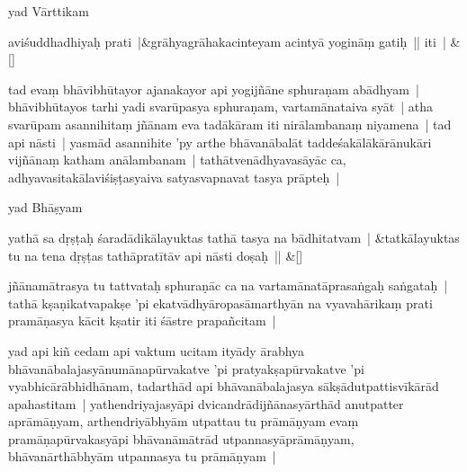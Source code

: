 \documentclass[article,12pt,a4paper]{memoir}%
\newcommand{\name}[1]{#1}
\newcounter{parCount}
\begin{document}
	  \pstart \leavevmode%
	\label{thakur75-22.1}yad Vārttikam 
	{}
	\pend%
      
	    
	    \stanza[\smallbreak]
	  aviśuddhadhiyaḥ prati |&grāhyagrāhakacinteyam acintyā yogināṃ gatiḥ || iti | \&[\smallbreak]
	  
	  
	  

	  \pstart \leavevmode%
	\label{thakur75-22.4}tad evaṃ bhāvibhūtayor ajanakayor api yogijñāne sphuraṇam abādhyam | bhāvibhūtayos tarhi yadi svarūpasya sphuraṇam, vartamānataiva syāt | atha svarūpam asannihitaṃ jñānam eva tadākāram iti nirālambanaṃ niyamena | tad api nāsti | yasmād asannihite 'py arthe bhāvanābalāt taddeśakālākārānukāri vijñānaṃ katham anālambanam | tathātvenādhyavasāyāc ca, adhyavasitakālaviśiṣṭasyaiva satyasvapnavat tasya prāpteḥ | 
	{}
	\pend%
      

	  \pstart \leavevmode%
	yad \name{Bhāṣyam}
	{}
	\pend%
      
	    
	    \stanza[\smallbreak]
	  yathā sa dṛṣṭaḥ śaradādikālayuktas tathā tasya na bādhitatvam | &tatkālayuktas tu na tena dṛṣṭas tathāpratītāv api nāsti doṣaḥ || \&[\smallbreak]
	  
	  
	  

	  \pstart \leavevmode%
	jñānamātrasya tu tattvataḥ sphuraṇāc ca na vartamānatāprasaṅgaḥ saṅgataḥ | tathā kṣaṇikatvapakṣe 'pi ekatvādhyāropasāmarthyān na vyavahārikaṃ prati pramāṇasya kācit kṣatir iti śāstre prapañcitam | 
	{}
	\pend%
      

	  \pstart \leavevmode%
	\label{thakur75-22.17}yad api kiñ cedam api vaktum ucitam ityādy ārabhya bhāvanābalajasyānumānapūrvakatve 'pi pratyakṣapūrvakatve 'pi vyabhicārābhidhānam, tadarthād api bhāvanābalajasya sākṣādutpattisvīkārād apahastitam | yathendriyajasyāpi dvicandrādijñānasyārthād anutpatter aprāmāṇyam, arthendriyābhyām utpattau tu prāmāṇyam evaṃ pramāṇapūrvakasyāpi bhāvanāmātrād utpannasyāprāmāṇyam, bhāvanārthābhyām utpannasya tu prāmāṇyam | 
	{}
	\pend%
      
\end{document}
